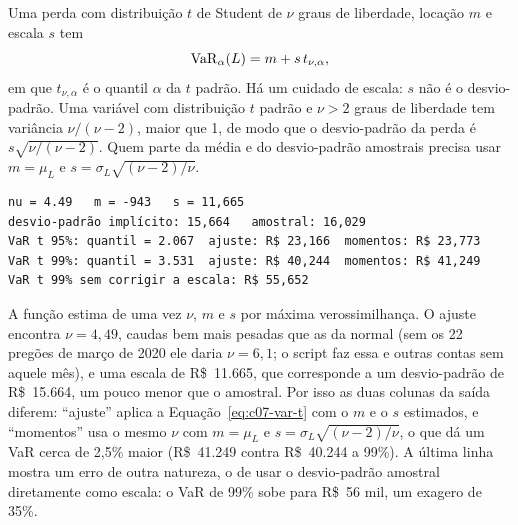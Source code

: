 Uma perda com distribuição $t$ de Student de $\nu$ graus de liberdade, locação $m$ e escala $s$ tem
\begin{equation}
  \operatorname{VaR}_\alpha(L) = m + s\, t_{\nu,\alpha} ,
  \label{eq:c07-var-t}
\end{equation}
em que $t_{\nu,\alpha}$ é o quantil $\alpha$ da $t$ padrão. Há um cuidado de escala: $s$ não é o desvio-padrão. Uma variável com distribuição $t$ padrão e $\nu > 2$ graus de liberdade tem variância $\nu/(\nu-2)$, maior que 1, de modo que o desvio-padrão da perda é $s\sqrt{\nu/(\nu-2)}$. Quem parte da média e do desvio-padrão amostrais precisa usar $m = \mu_L$ e $s = \sigma_L\sqrt{(\nu-2)/\nu}$.


\begin{lstlisting}[style=saida]
nu = 4.49   m = -943   s = 11,665
desvio-padrão implícito: 15,664   amostral: 16,029
VaR t 95%: quantil = 2.067  ajuste: R$ 23,166  momentos: R$ 23,773
VaR t 99%: quantil = 3.531  ajuste: R$ 40,244  momentos: R$ 41,249
VaR t 99% sem corrigir a escala: R$ 55,652
\end{lstlisting}

A função  estima de uma vez $\nu$, $m$ e $s$ por máxima verossimilhança. O ajuste encontra $\nu = 4,49$, caudas bem mais pesadas que as da normal (sem os 22 pregões de março de 2020 ele daria $\nu = 6,1$; o script  faz essa e outras contas sem aquele mês), e uma escala de R\$~11.665, que corresponde a um desvio-padrão de R\$~15.664, um pouco menor que o amostral. Por isso as duas colunas da saída diferem: ``ajuste'' aplica a Equação~\eqref{eq:c07-var-t} com o $m$ e o $s$ estimados, e ``momentos'' usa o mesmo $\nu$ com $m = \mu_L$ e $s = \sigma_L\sqrt{(\nu-2)/\nu}$, o que dá um VaR cerca de 2,5\% maior (R\$~41.249 contra R\$~40.244 a 99\%). A última linha mostra um erro de outra natureza, o de usar o desvio-padrão amostral diretamente como escala: o VaR de 99\% sobe para R\$~56 mil, um exagero de 35\%.


